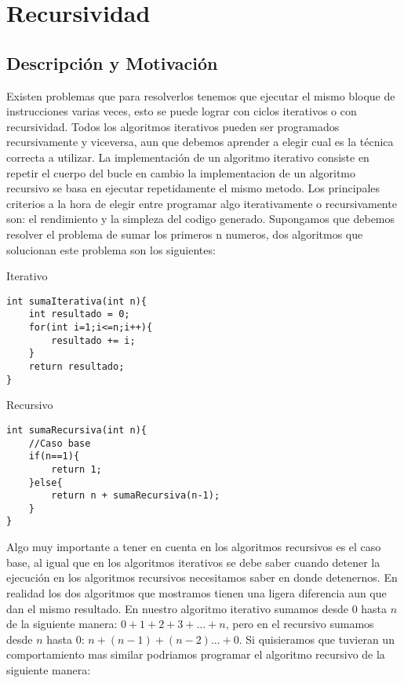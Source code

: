 \chapter{Recursividad}
\section{Descripción y Motivación}

Existen problemas que para resolverlos tenemos que ejecutar el mismo bloque de instrucciones
varias veces, esto se puede lograr con ciclos iterativos o con recursividad. Todos los algoritmos
iterativos pueden ser programados recursivamente y viceversa, aun que debemos aprender a elegir
cual es la técnica correcta a utilizar. La implementación de un algoritmo iterativo consiste en repetir
el cuerpo del bucle en cambio la implementacion de un algoritmo recursivo se basa en ejecutar repetidamente el mismo metodo.
Los principales criterios a la hora de elegir entre programar algo iterativamente o recursivamente
son: el rendimiento y la simpleza del codigo generado.
Supongamos que debemos resolver el problema de sumar los primeros n numeros, dos algoritmos que
solucionan este problema son los siguientes:

\begin{minipage}{\textwidth}
Iterativo
\begin{lstlisting}[style=C,caption=sumaIterativa.cpp]
int sumaIterativa(int n){
    int resultado = 0;
    for(int i=1;i<=n;i++){
        resultado += i;
    }
    return resultado;
}
\end{lstlisting}
\end{minipage}

	\begin{minipage}{\textwidth}
Recursivo
\begin{lstlisting}[style=C,caption=sumaRecursiva.cpp]
int sumaRecursiva(int n){
    //Caso base
    if(n==1){
        return 1;
    }else{
        return n + sumaRecursiva(n-1);
    }
}
\end{lstlisting}
\end{minipage}

Algo muy importante a tener en cuenta en los algoritmos recursivos es el caso base, al igual que
en los algoritmos iterativos se debe saber cuando detener la ejecución en los algoritmos recursivos
necesitamos saber en donde detenernos.
En realidad los dos algoritmos que mostramos tienen una ligera
diferencia aun que dan el mismo resultado. En nuestro algoritmo iterativo sumamos desde $0$ hasta $n$ de la
siguiente manera: $0+1+2+3+...+n$, pero en el recursivo sumamos desde $n$ hasta $0$: $n+(n-1)+(n-2)...+0$.
Si quisieramos que tuvieran un comportamiento mas similar podriamos programar el algoritmo recursivo
de la siguiente manera:


